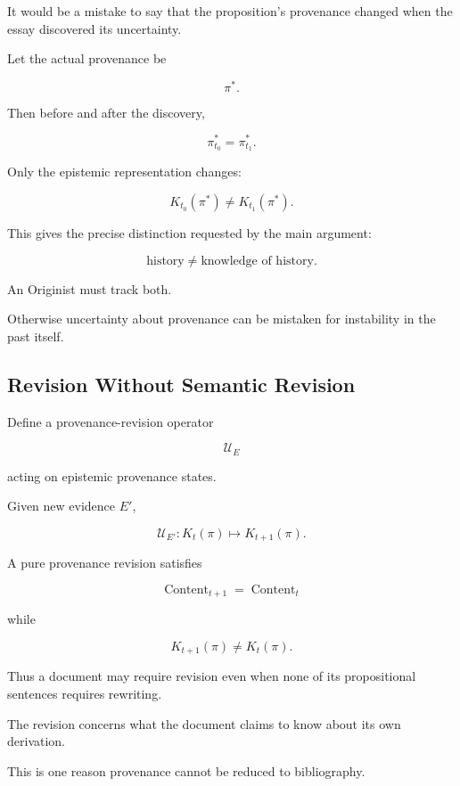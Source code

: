 \documentclass[
  11pt,
  a4paper,
  DIV=12,
  BCOR=0mm,
  parskip=half-
]{scrartcl}
\newcommand{\Content}{\operatorname{Content}}
\theoremstyle{definition}
\theoremstyle{plain}
\theoremstyle{remark}
\begin{document}
It would be a mistake to say that the proposition's provenance changed when
the essay discovered its uncertainty.

Let the actual provenance be

\[
  \pi^\ast.
\]

Then before and after the discovery,

\[
  \pi^\ast_{t_0}
  =
  \pi^\ast_{t_1}.
\]

Only the epistemic representation changes:

\[
  K_{t_0}(\pi^\ast)
  \neq
  K_{t_1}(\pi^\ast).
\]

This gives the precise distinction requested by the main argument:

\[
  \text{history}
  \neq
  \text{knowledge of history}.
\]

An Originist must track both.

Otherwise uncertainty about provenance can be mistaken for instability in the
past itself.


\subsection{Revision Without Semantic Revision}
\label{app:provenance-revision}

Define a provenance-revision operator

\[
  \mathcal U_E
\]

acting on epistemic provenance states.

Given new evidence \(E'\),

\[
  \mathcal U_{E'}:
  K_t(\pi)
  \mapsto
  K_{t+1}(\pi).
\]

A pure provenance revision satisfies

\[
  \Content_{t+1}
  =
  \Content_t
\]

while

\[
  K_{t+1}(\pi)
  \neq
  K_t(\pi).
\]

Thus a document may require revision even when none of its propositional
sentences requires rewriting.

The revision concerns what the document claims to know about its own
derivation.

This is one reason provenance cannot be reduced to bibliography.
\end{document}

